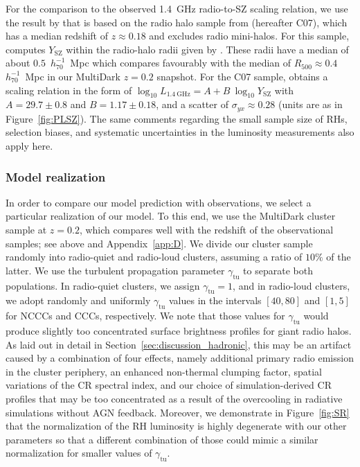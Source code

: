 \documentclass[traditabstract]{aa}
\newcommand{\rmn}{\mathrm}
\begin{document}
For the comparison to the observed 1.4~GHz radio-to-SZ scaling relation, we use
the result by \cite{2012MNRAS.421L.112B} that is based on the radio halo sample
from \cite{2007MNRAS.378.1565C} (hereafter C07), which has a median redshift of
$z \approx 0.18$ and excludes radio mini-halos. For this sample,
\cite{2012MNRAS.421L.112B} computes $Y_{\rmn{SZ}}$ within the radio-halo radii
given by \cite{2007MNRAS.378.1565C}. These radii have a median of about
$0.5$~$h_{70}^{-1}$~Mpc which compares favourably with the median of $R_{500}
\approx 0.4$~$h_{70}^{-1}$~Mpc in our MultiDark $z = 0.2$ snapshot. For the C07
sample, \cite{2012MNRAS.421L.112B} obtains a scaling relation in the form of
$\log_{10} L_{1.4~\rmn{GHz}} = A + B~\log_{10} Y_{\rmn{SZ}}$ with $A=29.7\pm0.8$
and $B=1.17\pm0.18$, and a scatter of $\sigma_{yx} \approx 0.28$ (units are as
in Figure~\ref{fig:PLSZ}). The same comments regarding the small sample size of
RHs, selection biases, and systematic uncertainties in the luminosity
measurements also apply here.


\subsubsection{Model realization}

In order to compare our model prediction with observations, we select a
particular realization of our model. To this end, we use the MultiDark cluster
sample at $z=0.2$, which compares well with the redshift of the observational
samples; see above and Appendix~\ref{app:D}. We divide our cluster sample
randomly into radio-quiet and radio-loud clusters, assuming a ratio of $10\%$ of
the latter. We use the turbulent propagation parameter $\gamma_{\rmn{tu}}$ to
separate both populations. In radio-quiet clusters, we assign
$\gamma_{\rmn{tu}}=1$, and in radio-loud clusters, we adopt randomly and
uniformly $\gamma_{\rmn{tu}}$ values in the intervals $[40,80]$ and $[1,5]$ for
NCCCs and CCCs, respectively. We note that those values for $\gamma_{\rmn{tu}}$
would produce slightly too concentrated surface brightness profiles for giant
radio halos. As laid out in detail in Section~\ref{sec:discussion_hadronic},
this may be an artifact caused by a combination of four effects, namely
additional primary radio emission in the cluster periphery, an enhanced
non-thermal clumping factor, spatial variations of the CR spectral index, and
our choice of simulation-derived CR profiles that may be too concentrated as a
result of the overcooling in radiative simulations without AGN
feedback. Moreover, we demonstrate in Figure~\ref{fig:SR} that the normalization
of the RH luminosity is highly degenerate with our other parameters so that a
different combination of those could mimic a similar normalization for smaller
values of $\gamma_{\rmn{tu}}$.
\end{document}
